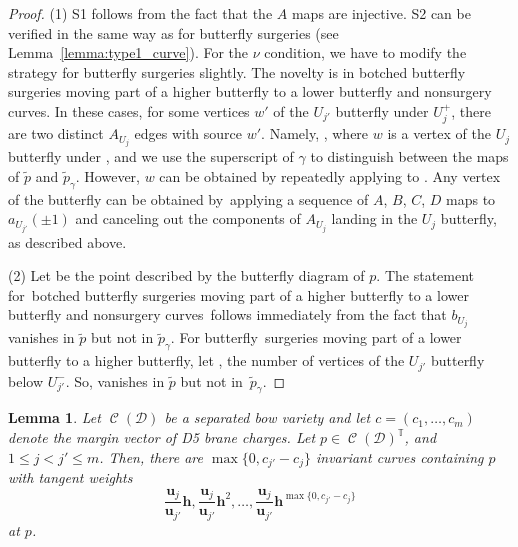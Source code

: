 \documentclass[pdftex]{sigma}
\numberwithin{equation}{section}
\newtheorem{Lemma}[Theorem]{Lemma}
\newcommand{\brane}{\mathcal D}
\newcommand{\torus}{\mathbb T}
\newcommand{\MM}{\mathbb M}
\newcommand{\hb}{\mathbf h}
\newcommand{\ub}{\mathbf u}
\newcommand{\prequot}{\widetilde \MM^s}
\DeclareMathOperator{\bowvar}{\mathcal C}
\begin{document}
\begin{proof}
(1) S1 follows from the fact that the $A$ maps are injective. S2 can be verified in the same way as for butterfly surgeries (see Lemma~\ref{lemma:type1_curve}). For the $\nu$ condition, we have to modify the strategy for butterfly surgeries slightly. The novelty is in botched butterfly surgeries moving part of a higher butterfly to a lower butterfly and nonsurgery curves. In these cases, for some vertices $w'$ of the $U_{j'}$ butterfly under $U_j^+$, there are two distinct $A_{U_j}$ edges with source $w'$. Namely, , where $w$ is a vertex of the $U_j$ butterfly under , and we use the superscript of $\gamma$ to distinguish between the maps of $\tilde{p}$ and $\tilde{p}_\gamma$. However, $w$ can be obtained by repeatedly applying  to . Any vertex of the  butterfly can be obtained by~applying a sequence of $A$, $B$, $C$, $D$ maps to $a_{U_{j'}}(\pm 1)$ and canceling out the components of $A_{U_j}$ landing in the $U_j$ butterfly, as described above.

(2) Let \smash{$\tilde{p} \in \prequot$} be the point described by the butterfly diagram of $p$. The statement for~bot\-ched butterfly surgeries moving part of a higher butterfly to a lower butterfly and non\-sur\-gery curves~follows immediately from the fact that $b_{U_j}$ vanishes in $\tilde{p}$ but not in $\tilde{p}_\gamma$. For \linebreak butterfly~surgeries moving part of a lower butterfly to a higher butterfly, let
,
the number of vertices of the $U_{j'}$ butterfly below $U_{j'}^-$. So,  vanishes in $\tilde{p}$ but not in~$\tilde{p}_\gamma$.
\end{proof}

\begin{Lemma} \label{lemma:nonsurgery}
Let $\bowvar(\brane)$ be a separated bow variety and let $c = (c_1, \dots , c_m)$ denote the margin vector of D5 brane charges. Let $p\in \bowvar(\brane)^\torus$, and $1\leq j < j' \leq m$. Then, there are $\max\{0, c_{j'} - c_j\}$ invariant curves containing $p$ with tangent weights
\[
\frac{\ub_j}{\ub_{j'}}\hb, \frac{\ub_j}{\ub_{j'}}\hb^2, \dots , \frac{\ub_j}{\ub_{j'}}\hb^{\max\{0, c_{j'} - c_j\}}
\]
at $p$.
\end{Lemma}
\end{document}
